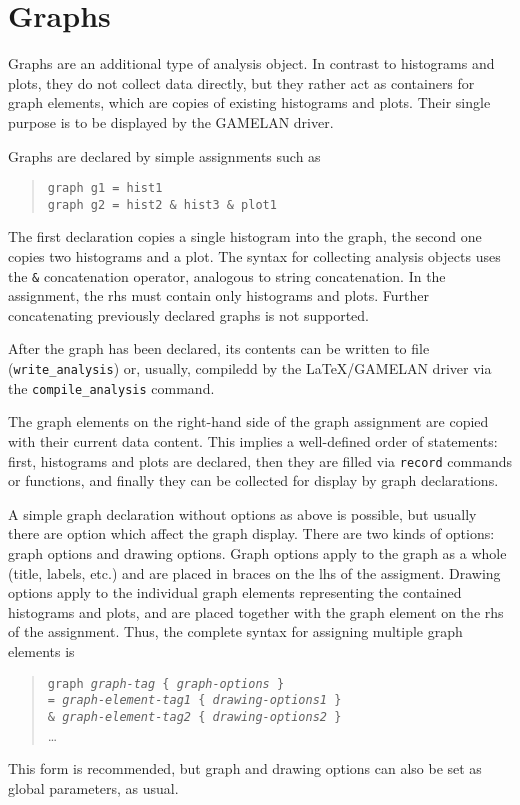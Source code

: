 \documentclass[12pt]{book}
\newcommand{\ttt}[1]{\texttt{#1}}
\begin{document}
\section{Graphs}
\label{sec:graphs}

Graphs are an additional type of analysis object.  In contrast to histograms
and plots, they do not collect data directly, but they rather act as
containers for graph elements, which are copies of existing histograms and
plots.  Their single purpose is to be displayed by the GAMELAN driver.

Graphs are declared by simple assignments such as
\begin{quote}
  \begin{footnotesize}
    \ttt{graph g1 = hist1}
\\
    \ttt{graph g2 = hist2 \& hist3 \& plot1}
  \end{footnotesize}
\end{quote}
The first declaration copies a single histogram into the graph, the second one
copies two histograms and a plot.  The syntax for collecting analysis objects
uses the \ttt{\&} concatenation operator, analogous to string concatenation.
In the assignment, the rhs must contain only histograms and plots.  Further
concatenating previously declared graphs is not supported.

After the graph has been declared, its contents can be written to file
(\ttt{write\_analysis}) or, usually, compiledd by the \LaTeX/GAMELAN driver
via the \ttt{compile\_analysis} command.

The graph elements on the right-hand side of the graph assignment are copied
with their current data content.  This implies a well-defined order of
statements: first, histograms and plots are declared, then they are filled via
\ttt{record} commands or functions, and finally they can be collected for
display by graph declarations.

A simple graph declaration without options as above is possible, but usually
there are option which affect the graph display.  There are two kinds of
options: graph options and drawing options.  Graph options apply to the graph
as a whole (title, labels, etc.) and are placed in braces on the lhs of the
assigment.  Drawing options apply to the individual graph elements
representing the contained histograms and plots, and are placed together with
the graph element on the rhs of the assignment.  Thus, the complete syntax for
assigning multiple graph elements is
\begin{quote}
  \begin{footnotesize}
    \ttt{graph \emph{graph-tag} \{ \emph{graph-options} \}}
\\
    \ttt{= \emph{graph-element-tag1} \{ \emph{drawing-options1} \}}
\\
    \ttt{\& \emph{graph-element-tag2} \{ \emph{drawing-options2} \}}
\\
     \ldots
  \end{footnotesize}
\end{quote}
This form is recommended, but graph and drawing options can also be set as
global parameters, as usual.
\end{document}
